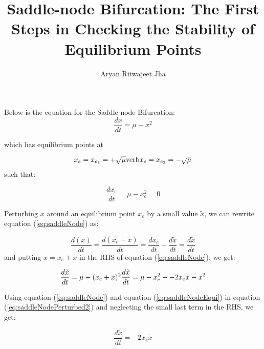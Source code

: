 \documentclass{article}
\begin{document}
	
	\title{Saddle-node Bifurcation: The First Steps in Checking the Stability of Equilibrium Points}
	\author{Aryan Ritwajeet Jha}
	\maketitle
	
	Below is the equation for the Saddle-node Bifurcation: 
	\begin{equation}
		\label{eq:saddleNode}
		\frac{dx}{dt} = \mu - x^2
	\end{equation}
	
	which has equilibrium points at
	
	\begin{equation}
		x_e = x_{e_1} = +\sqrt\mu $\text{verb}$
		x_e = x_{e_2} = -\sqrt\mu
	\end{equation} 
	 such that:
	
	\begin{equation}
		\label{eq:saddleNodeEqui}
		\frac{dx_e}{dt} = \mu - x_e^2 = 0 
	\end{equation}
	
	
	Perturbing $x$ around an equilibrium point $x_e$ by a small value $\tilde x$, we can rewrite equation (\ref{eq:saddleNode}) as:
	
	\begin{equation}
		\label{eq:saddleNodePerturbed}
		\frac{d(x)}{dt} = \frac{d(x_e + \tilde x)}{dt} =\frac{dx_e}{dt} + \frac{d \tilde x}{dt} = \frac{d \tilde x}{dt} 
	\end{equation}
	and putting $x = x_e + \tilde x$ in the RHS of equation (\ref{eq:saddleNode}), we get:
	
	\begin{equation}
		\label{eq:saddleNodePerturbed2}
		\frac{d\tilde x}{dt} = \mu - (x_e+\tilde x)^2 \\
		\frac{d\tilde x}{dt} = \mu - x_e^2 - -2x_e\tilde x - \tilde x^2
	\end{equation}
	
	Using equation (\ref{eq:saddleNode}) and equation (\ref{eq:saddleNodeEqui}) in equation (\ref{eq:saddleNodePerturbed2}) and neglecting the small last term in the RHS, we get:
	
	\begin{equation}
		\frac{d\tilde x}{dt} = -2x_e\tilde x
	\end{equation}
\end{document}

